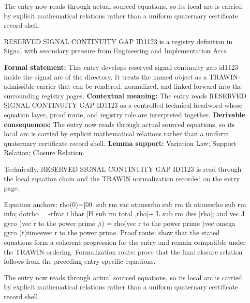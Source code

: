 The entry now reads through actual sourced equations, so its local arc is carried by explicit mathematical relations rather than a uniform quaternary certificate record shell.
\clearpage


\begingroup\small
{}
RESERVED SIGNAL CONTINUITY GAP ID1123 is a registry definition in Signal with secondary pressure from Engineering and Implementation Arcs.

\begingroup\footnotesize\setlength{\emergencystretch}{3em}\sloppy
\textbf{Formal statement:} This entry develops reserved signal continuity gap id1123 inside the signal arc of the directory. It treats the named object as a TRAWIN-admissible carrier that can be rendered, normalized, and linked forward into the surrounding registry pages. \textbf{Contextual meaning:} The entry reads RESERVED SIGNAL CONTINUITY GAP ID1123 as a controlled technical headword whose equation layer, proof route, and registry role are interpreted together. \textbf{Derivable consequences:} The entry now reads through actual sourced equations, so its local arc is carried by explicit mathematical relations rather than a uniform quaternary certificate record shell. \textbf{Lemma support:} Variation Law; Support Relation; Closure Relation.\par
\endgroup

Technically, RESERVED SIGNAL CONTINUITY GAP ID1123 is read through the local equation chain and the TRAWIN normalization recorded on the entry page.

Equation anchors: rho(0)=|00| sub rm vac otimesrho sub rm th otimesrho sub rm info; dotrho = -tfrac i hbar [H sub rm total ,rho]+ L sub rm diss [rho]; and vec J gyro (vec r to the power prime ,t) = rho(vec r to the power prime )vec omega gyro (t)timesvec r to the power prime. Proof route: show that the stated equations form a coherent progression for the entry and remain compatible under the TRAWIN ordering. Formalization route: prove that the final closure relation follows from the preceding entry-specific equations.

The entry now reads through actual sourced equations, so its local arc is carried by explicit mathematical relations rather than a uniform quaternary certificate record shell.
\endgroup

